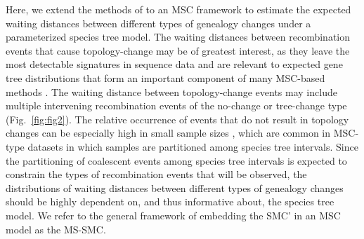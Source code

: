 \documentclass[11pt]{article}
\begin{document}
Here, we extend the methods of \citet{deng_distribution_2021} to an MSC framework
to estimate the expected waiting distances between different types of 
genealogy changes under a parameterized species tree model. 
The waiting distances between recombination events that cause topology-change 
may be of greatest interest, as they leave the most detectable signatures 
in sequence data and are relevant to expected gene tree distributions that form
an important component of many MSC-based methods \citep{
degnan2009gene, baum_concordance_2007, knowles_estimating_2011}.
The waiting distance between topology-change events may include multiple
intervening recombination events of the no-change or tree-change type
(Fig.~\ref{fig:fig2}). 
The relative occurrence of events that do not result in topology 
changes can be especially high in small sample sizes \citep{wilton2015smc}, 
which are common in MSC-type datasets in which samples are partitioned 
among species tree intervals. 
Since the partitioning of 
coalescent events among species tree intervals is expected to constrain 
the types of recombination events that will be observed, the
distributions of waiting distances between different types of 
genealogy changes should be highly dependent on, and thus informative about, 
the species tree model. We refer to the general framework of embedding the 
SMC' in an MSC model as the MS-SMC.



\end{document}
